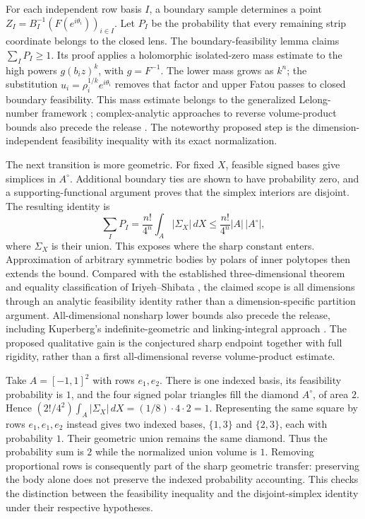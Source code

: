 For each independent row basis \(I\), a boundary sample determines a
point \(Z_I=B_I^{-1}(F(e^{i\theta_i}))_{i\in I}\). Let \(P_I\) be the
probability that every remaining strip coordinate belongs to the closed
lens. The boundary-feasibility lemma claims \(\sum_I P_I\ge1\).
Its proof applies a holomorphic isolated-zero mass estimate to the
high powers \(g(b_i z)^k\), with \(g=F^{-1}\). The lower mass grows as
\(k^n\); the substitution \(u_i=\rho_i^{1/k}e^{i\theta_i}\) removes
that factor and upper Fatou passes to closed boundary feasibility.
This mass estimate belongs to the generalized Lelong-number framework
\cite[Sections~3 and~5]{GODemailly1993}; complex-analytic approaches
to reverse volume-product bounds also precede the release
\cite{GOBerndtsson2021}. The noteworthy proposed step is the
dimension-independent feasibility inequality with its exact normalization.

The next transition is more geometric. For fixed \(X\), feasible signed
bases give simplices in \(A^\circ\). Additional boundary ties are shown
to have probability zero, and a supporting-functional argument proves
that the simplex interiors are disjoint. The resulting identity is
\[
 \sum_I P_I
 =\frac{n!}{4^n}\int_A|\Sigma_X|\,dX
 \le\frac{n!}{4^n}|A|\,|A^\circ|,
\]
where \(\Sigma_X\) is their union. This exposes where the sharp constant
enters. Approximation of arbitrary symmetric bodies by polars of inner
polytopes then extends the bound. Compared with the established
three-dimensional theorem and equality classification of Iriyeh--Shibata
\cite{GOIriyehShibata2020}, the claimed scope is all dimensions through
an analytic feasibility identity rather than a dimension-specific
partition argument.
All-dimensional nonsharp lower bounds also precede the release, including
Kuperberg's indefinite-geometric and linking-integral approach
\cite{GOKuperberg2008}. The proposed qualitative gain is the conjectured
sharp endpoint together with full rigidity, rather than a first
all-dimensional reverse volume-product estimate.

\begin{example}
Take $A=[-1,1]^2$ with rows $e_1,e_2$. There is one indexed basis,
its feasibility probability is $1$, and the four signed polar triangles
fill the diamond $A^\circ$, of area $2$. Hence
$(2!/4^2)\int_A|\Sigma_X|\,dX=(1/8)\cdot4\cdot2=1$.
Representing the same square by rows $e_1,e_1,e_2$ instead gives two
indexed bases, $\{1,3\}$ and $\{2,3\}$, each with probability $1$.
Their geometric union remains the same diamond. Thus the probability
sum is $2$ while the normalized union volume is $1$.
Removing proportional rows is consequently part of the sharp geometric
transfer: preserving the body alone does not preserve the indexed
probability accounting. This checks the distinction between the
feasibility inequality and the disjoint-simplex identity under their
respective hypotheses.
\end{example}

